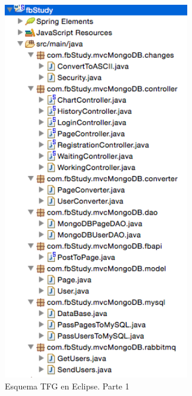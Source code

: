\begin{figure}[H]
\centering
\includegraphics[width=3.2in]{figuras/esquemaBackend.png}
\caption{Esquema TFG en Eclipse. Parte 1} \label{fig:esqEclipseB}
\end{figure}

